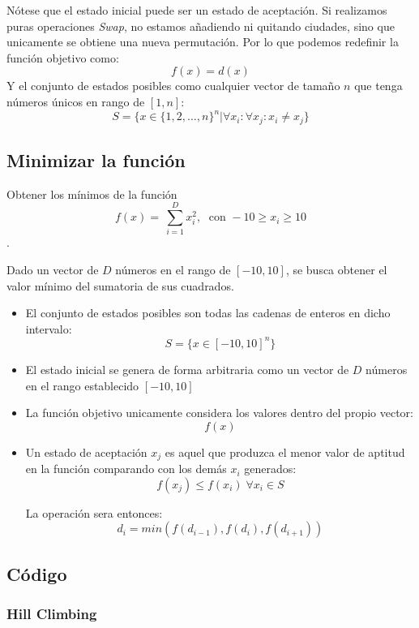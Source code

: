\documentclass[12pt,twoside]{article}
\begin{document}
	
	
	Nótese que el estado inicial puede ser un estado de aceptación. Si realizamos puras operaciones \textit{Swap}, no estamos añadiendo ni quitando ciudades, sino que unicamente se obtiene una nueva permutación. Por lo que podemos redefinir la función objetivo como: \[ f(x) = d(x) \] Y el conjunto de estados posibles como cualquier vector de tamaño $n$ que tenga números únicos en rango de $[1,n]$: \[ S = \{ x \in \{1, 2, \dots, n  \}^n | \forall x_i \colon \forall x_j \colon x_i \neq x_j \}\]
	
	\subsection{Minimizar la función}
	
	Obtener los mínimos de la función \[ f(x) = \ \sum_{i = 1}^{D} x_i^2, \; \text{ con } -10 \geq x_i \geq 10 \].
	
	Dado un vector de $D$ números en el rango de $[-10, 10]$, se busca obtener el valor mínimo del sumatoria  de sus cuadrados.
	
	\begin{itemize}
		\item El conjunto de estados posibles son todas las cadenas de enteros en dicho intervalo: \[ S = \{ x \in [-10, 10]^n \} \]
		
		\item El estado inicial se genera de forma arbitraria como un vector de $D$ números en el rango establecido $[-10, 10]$
		
		\item La función objetivo unicamente considera los valores dentro del propio vector: \[f(x) \]
		
		\item Un estado de aceptación $x_j$ es aquel que produzca el menor valor de aptitud en la función comparando con los demás $x_i$ generados: \[ f(x_j) \leq f(x_i) \; \forall x_i \in S\] 

		La operación sera entonces:
		\[ d_i = min(f(d_{i-1}), f(d_i), f(d_{i+1})) \]	
	\end{itemize}

\clearpage
\subsection{Código}

\subsubsection{Hill Climbing}
\end{document}
